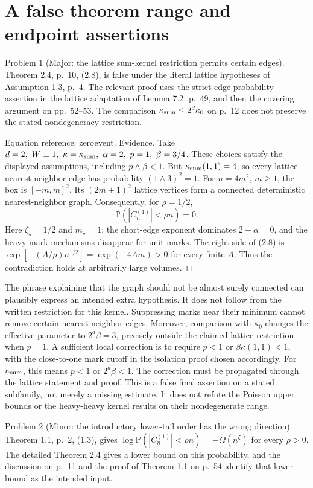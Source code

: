 \documentclass[10pt]{article}
\begin{document}
\section*{A false theorem range and endpoint assertions}
Problem 1 (Major: the lattice sum-kernel restriction permits certain edges).  Theorem 2.4, p. 10, (2.8), is false under the literal lattice hypotheses of Assumption 1.3, p. 4. The relevant proof uses the strict edge-probability assertion in the lattice adaptation of Lemma 7.2, p. 49, and then the covering argument on pp. 52–53. The comparison \(\kappa_{\rm sum}\leq2^d\kappa_0\) on p. 12 does not preserve the stated nondegeneracy restriction.\par
Equation reference: zeroevent. Evidence. Take \(d=2,\ W\equiv1,\ \kappa=\kappa_{\rm sum},\
\alpha=2,\ p=1,\ \beta=3/4\). These choices satisfy the displayed assumptions, including \(p\wedge\beta<1\). But \(\kappa_{\rm sum}(1,1)=4\), so every lattice nearest-neighbor edge has probability \((1\wedge3)^2=1\). For \(n=4m^2\), \(m\geq1\), the box is \([-m,m]^2\). Its \((2m+1)^2\) lattice vertices form a connected deterministic nearest-neighbor graph. Consequently, for \(\rho=1/2\), \[
 \mathbb P(|C_n^{(1)}|<\rho n)=0.\] Here \(\zeta_\star=1/2\) and \(m_\star=1\): the short-edge exponent dominates \(2-\alpha=0\), and the heavy-mark mechanisms disappear for unit marks. The right side of (2.8) is \(\exp[-(A/\rho)n^{1/2}]=\exp(-4Am)>0\) for every finite \(A\). Thus the contradiction holds at arbitrarily large volumes. ◻\par
The phrase explaining that the graph should not be almost surely connected can plausibly express an intended extra hypothesis. It does not follow from the written restriction for this kernel. Suppressing marks near their minimum cannot remove certain nearest-neighbor edges. Moreover, comparison with \(\kappa_0\) changes the effective parameter to \(2^d\beta=3\), precisely outside the claimed lattice restriction when \(p=1\). A sufficient local correction is to require \(p<1\) or \(\beta\kappa(1,1)<1\), with the close-to-one mark cutoff in the isolation proof chosen accordingly. For \(\kappa_{\rm sum}\), this means \(p<1\) or \(2^d\beta<1\). The correction must be propagated through the lattice statement and proof. This is a false final assertion on a stated subfamily, not merely a missing estimate. It does not refute the Poisson upper bounds or the heavy-heavy kernel results on their nondegenerate range.\par
Problem 2 (Minor: the introductory lower-tail order has the wrong direction).  Theorem 1.1, p. 2, (1.3), gives \(\log\mathbb P(|C_n^{(1)}|<\rho n)=-\Omega(n^\zeta)\) for every \(\rho>0\). The detailed Theorem 2.4 gives a lower bound on this probability, and the discussion on p. 11 and the proof of Theorem 1.1 on p. 54 identify that lower bound as the intended input.\par
\end{document}
